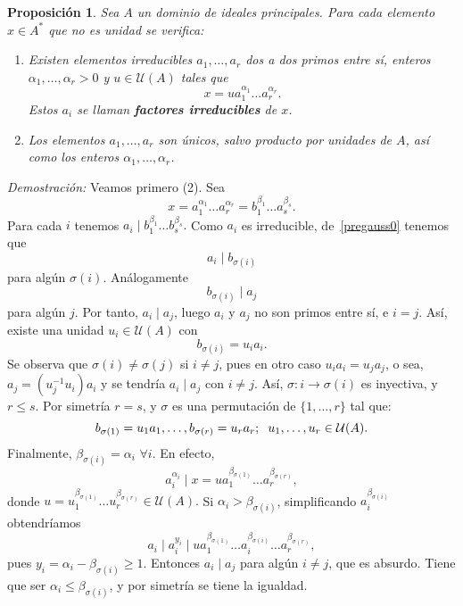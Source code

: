 \documentclass[12pt]{article}
\newtheorem{proposition}[theorem]{Proposición}
\begin{document}
\begin{proposition} Sea $A$ un dominio de ideales principales. Para cada elemento $x \in A^{\ast}$ que no es unidad se verifica: \begin{enumerate}
\item Existen elementos irreducibles $a_{1}, \ldots, a_{r}$ dos a dos primos entre sí, enteros $\alpha_{1}, \ldots, \alpha_{r} > 0$ y $u \in \mathcal{U}(A)$ tales que $$x = ua_{1}^{\alpha_{1}}\ldots a_{r}^{\alpha_{r}}.$$ Estos $a_{i}$ se llaman \textbf{factores irreducibles} de $x$.
\item Los elementos $a_{1}, \ldots, a_{r}$ son únicos, salvo producto por unidades de $A$, así como los enteros $\alpha_{1}, \ldots,\alpha_{r}$. 
\end{enumerate}
\end{proposition}
\emph{Demostración: } Veamos primero (2). Sea $$x = a_{1}^{\alpha_{1}} \ldots  a_{r}^{\alpha_{r}} = b_{1}^{\beta_{1}} \ldots  a_{s}^{\beta_{s}}.$$ Para cada $i$ tenemos $a_{i} \mid b_{1}^{\beta_{1}} \ldots b_{s}^{\beta_{s}}.$ Como $a_{i}$ es irreducible, de~\ref{pregauss0} tenemos que $$a_{i} \mid b_{\sigma (i)}$$ para algún $\sigma (i)$. Análogamente $$b_{\sigma(i)}\mid a_{j}$$ para algún $j$. Por tanto, $a_{i} \mid a_{j}$, luego $a_{i}$ y $a_{j}$ no son primos entre sí, e $i = j$. Así, existe una unidad $u_{i} \in \mathcal{U}(A)$ con $$b_{\sigma(i)} = u_{i}a_{i}.$$ Se observa que $\sigma(i) \neq \sigma (j)$ si $i \neq j$, pues en otro caso $u_{i}a_{i} = u_{j}a_{j}$, o sea, $a_{j} = (u_{j}^{-1}u_{i})a_{i}$ y se tendría $a_{i} \mid a_{j}$ con $i \neq j$. Así, $\sigma \colon i \longrightarrow \sigma (i)$ es inyectiva, y $r \leq s$. Por simetría $r = s$, y $\sigma$ es una permutación de $\lbrace 1, \ldots, r \rbrace$ tal que: $$b_{\sigma(1)} = u_{1}a_{1}, \ldots, b_{\sigma(r)} = u_{r}a_{r}; \hspace{0.2cm} u_{1}, \ldots, u_{r} \in \mathcal{U}(A).$$
Finalmente, $\beta_{\sigma(i)} = \alpha_{i} $ $\forall i$. En efecto, $$a_{i}^{\alpha_{i}} \mid x = u a_{1}^{\beta_{\sigma(1)}} \ldots a_{r}^{\beta_{\sigma(r)}},$$ donde $u = u_{1}^{\beta_{\sigma(1)}} \ldots u_{r}^{\beta_{\sigma(r)}} \in \mathcal{U}(A).$ Si $\alpha_{i} > \beta_{\sigma(i)}$, simplificando $a_{i}^{\beta_{\sigma(i)}}$ obtendríamos $$a_{i} \mid a_{i}^{y_{i}} \mid  u a_{1}^{\beta_{\sigma(1)}} \ldots a_{i}^{\beta_{\sigma(i)}} \ldots a_{r}^{\beta_{\sigma(r)}},$$ pues $y_{i} = \alpha_{i} - \beta_{\sigma(i)} \geq 1.$ Entonces $a_{i} \mid a_{j}$ para algún $i \neq j$, que es absurdo. Tiene que ser $\alpha_{i} \leq \beta_{\sigma(i)}$, y por simetría se tiene la igualdad. 
\end{document}
